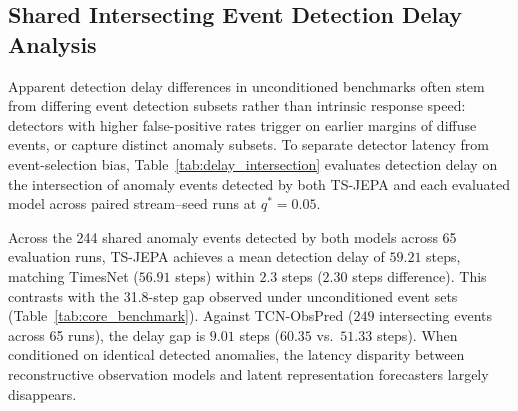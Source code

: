 \subsection{Shared Intersecting Event Detection Delay Analysis}
\label{subsec:delay_intersection_analysis}
Apparent detection delay differences in unconditioned benchmarks often stem from differing event detection subsets rather than intrinsic response speed: detectors with higher false-positive rates trigger on earlier margins of diffuse events, or capture distinct anomaly subsets. To separate detector latency from event-selection bias, Table~\ref{tab:delay_intersection} evaluates detection delay on the intersection of anomaly events detected by both TS-JEPA and each evaluated model across paired stream--seed runs at $q^*{=}0.05$.

Across the 244 shared anomaly events detected by both models across 65 evaluation runs, TS-JEPA achieves a mean detection delay of $59.21$ steps, matching TimesNet ($56.91$ steps) within $2.3$ steps ($2.30$ steps difference). This contrasts with the 31.8-step gap observed under unconditioned event sets (Table~\ref{tab:core_benchmark}). Against TCN-ObsPred ($249$ intersecting events across 65 runs), the delay gap is $9.01$ steps ($60.35$ vs.\ $51.33$ steps). When conditioned on identical detected anomalies, the latency disparity between reconstructive observation models and latent representation forecasters largely disappears.


